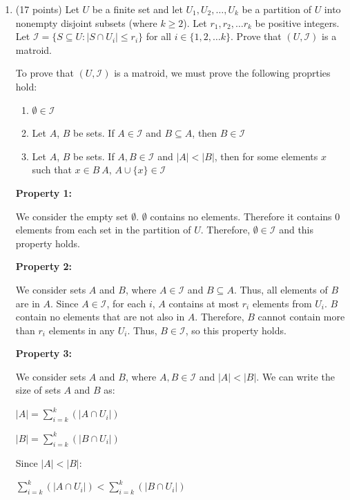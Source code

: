 \documentclass[11pt]{article}
\newcommand{\union}{\cup}
\begin{document}
\begin{enumerate}
\item (17 points) Let $U$ be a finite set and let $U_1, U_2, \dots, U_k$ be a partition of $U$ into nonempty disjoint subsets (where $k \geq 2$). 
Let $r_1, r_2, \dots r_k$ be positive integers.  Let $\mathcal I = \{ S \subseteq U : |S \cap U_i| \leq r_i\}$ for all $i \in \{1,2,\dots k\}$. 
Prove that $(U, \mathcal I)$ is a matroid.  

To prove that $(U, \mathcal I)$ is a matroid, we must prove the following proprties hold:

\begin{enumerate}[label=\arabic*., noitemsep]
    \item $\emptyset \in \mathcal I$
    \item Let $A$, $B$ be sets. If $A \in \mathcal I$ and $B \subseteq A$, then $B \in \mathcal I$
    \item Let $A$, $B$ be sets. If $A, B \in \mathcal I$ and $|A| < |B|$, then for some elements $x$ such that $x \in B \ A$, 
    $A \union \{x\} \in \mathcal I$
\end{enumerate}

\medbreak

\textbf{Property 1:}

We consider the empty set $\emptyset$. $\emptyset$ contains no elements. Therefore it contains $0$ elements from each set in the partition of $U$. 
Therefore, $\emptyset \in \mathcal I$ and this property holds.

\medbreak

\textbf{Property 2:}

We consider sets $A$ and $B$, where $A \in \mathcal I$ and $B \subseteq A$. Thus, all elements of $B$ are in $A$. Since $A \in \mathcal I$, 
for each $i$, $A$ contains at most $r_i$ elements from $U_i$. $B$ contain no elements that are not also in $A$. 
Therefore, $B$ cannot contain more than $r_i$ elements in any $U_i$. Thus, $B \in \mathcal I$, so this property holds.

\medbreak

\textbf{Property 3:}

We consider sets $A$ and $B$, where $A, B \in \mathcal I$ and $|A| < |B|$. We can write the size of sets $A$ and $B$ as:

$|A| = \sum_{i=k}^{k} (|A \cap U_i|)$

$|B| = \sum_{i=k}^{k} (|B \cap U_i|)$

Since $|A| < |B|$:

$\sum_{i=k}^{k} (|A \cap U_i|) < \sum_{i=k}^{k} (|B \cap U_i|)$


\end{enumerate}
\end{document}
